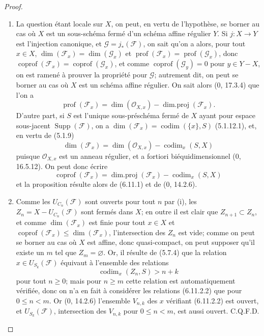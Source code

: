 \begin{proof}
\begin{enumerate}
\item[(i)] La question étant locale sur $X$, on peut, en vertu de
l'hypothèse, se borner au cas où $X$ est un sous-schéma fermé d'un schéma
affine régulier $Y$. Si $j:X\to Y$ est l'injection canonique, et
$\mathcal G=j_*(\mathcal F)$, on sait qu'on a alors, pour tout $x\in X$,
$\dim(\mathcal F_x)=\dim(\mathcal G_x)$ et
$\operatorname{prof}(\mathcal F_x)=\operatorname{prof}(\mathcal G_x)$,
donc $\operatorname{coprof}(\mathcal F_x)=
\operatorname{coprof}(\mathcal G_x)$, et comme
$\operatorname{coprof}(\mathcal G_y)=0$ pour $y\in Y-X$, on est ramené à
prouver la propriété pour $\mathcal G$; autrement dit, on peut se borner au
cas où $X$ est un schéma affine régulier. On sait alors (0, 17.3.4) que
l'on a
\[
\operatorname{prof}(\mathcal F_x)=\dim(\mathcal O_{X,x})-
\operatorname{dim.proj}(\mathcal F_x).
\]
D'autre part, si $S$ est l'unique sous-préschéma fermé de $X$ ayant pour
espace sous-jacent $\operatorname{Supp}(\mathcal F)$, on a
$\dim(\mathcal F_x)=\operatorname{codim}(\{x\},S)$ (5.1.12.1), et, en
vertu de (5.1.9)
\[
\dim(\mathcal F_x)=\dim(\mathcal O_{X,x})-\operatorname{codim}_x(S,X)
\]
puisque $\mathcal O_{X,x}$ est un anneau régulier, et a fortiori
biéquidimensionnel (0, 16.5.12). On peut donc écrire
\begin{equation}
\operatorname{coprof}(\mathcal F_x)=
\operatorname{dim.proj}(\mathcal F_x)-\operatorname{codim}_x(S,X)
\tag{6.11.2.1}\label{IV.2.s6.11.2.1-fr}
\end{equation}
et la proposition résulte alors de (6.11.1) et de (0, 14.2.6).


\item[(ii)] Comme les $U_{C_n}(\mathcal F)$ sont ouverts pour tout $n$ par
(i), les $Z_n=X-U_{C_n}(\mathcal F)$ sont fermés dans $X$; en outre il est
clair que $Z_{n+1}\subset Z_n$, et comme $\dim(\mathcal F_x)$ est finie
pour tout $x\in X$ et
$\operatorname{coprof}(\mathcal F_x)\leq\dim(\mathcal F_x)$,
l'intersection des $Z_n$ est vide; comme on peut se borner au cas où $X$
est affine, donc quasi-compact, on peut supposer qu'il existe un $m$ tel
que $Z_m=\varnothing$. Or, il résulte de (5.7.4) que la relation
$x\in U_{S_k}(\mathcal F)$ équivaut à l'ensemble des relations
\begin{equation}
\operatorname{codim}_x(Z_n,S)>n+k
\tag{6.11.2.2}\label{IV.2.s6.11.2.2-fr}
\end{equation}
pour tout $n\geq0$; mais pour $n\geq m$ cette relation est automatiquement
vérifiée, donc on n'a en fait à considérer les relations (6.11.2.2) que
pour $0\leq n<m$. Or (0, 14.2.6) l'ensemble $V_{n,k}$ des $x$ vérifiant
(6.11.2.2) est ouvert, et $U_{S_k}(\mathcal F)$, intersection des $V_{n,k}$
pour $0\leq n<m$, est aussi ouvert. C.Q.F.D.
\end{enumerate}
\end{proof}

